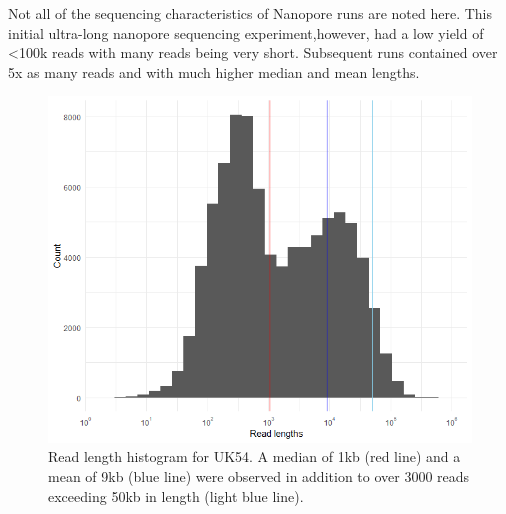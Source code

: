 \documentclass{article}
\begin{document}
Not all of the  sequencing characteristics of Nanopore runs are noted here. This initial ultra-long nanopore sequencing experiment,however, had a low yield of <100k reads with many reads being very short. Subsequent runs contained over 5x as many reads and with much higher median and mean lengths.


\begin{figure}[h!]
\centering
\includegraphics[width=\textwidth{}]{Chapter_2/read counts.png}
\caption{ Read length histogram for UK54. A median of 1kb (red line) and a mean of 9kb (blue line) were observed in addition to over 3000 reads exceeding 50kb in length (light blue line).}
\label{fig:Read_counts}
\end{figure}
\end{document}
